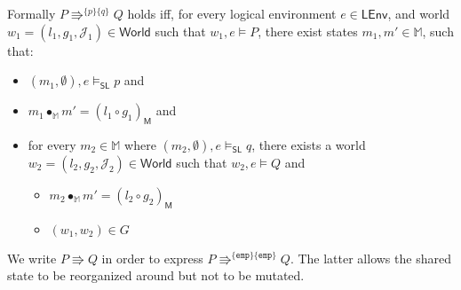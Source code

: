 Formally $P \Rrightarrow^{\{p\}\{q\}} Q$ holds iff, for every logical environment $e \in \mathsf{LEnv}$, and world $w_1 = (l_1, g_1, \mathcal{J}_1) \in \mathsf{World}$ such that $w_1, e \vDash P$, there exist states $m_1, m' \in \mathbb{M}$, such that:
\begin{itemize}
\item $(m_1, \emptyset), e \vDash_\mathsf{SL} p$ and
\item $m_1 \bullet_\mathbb{M} m' = (l_1 \circ g_1)_\mathsf{M}$ and
\item for every $m_2 \in \mathbb{M}$ where $(m_2, \emptyset), e \vDash_\mathsf{SL} q$, there exists a world $w_2 = (l_2, g_2, \mathcal{J}_2) \in \mathsf{World}$ such that $w_2, e \vDash Q$ and
	\begin{itemize}
		\item $m_2 \bullet_\mathbb{M} m' = (l_2 \circ g_2)_\mathsf{M}$
		\item $(w_1, w_2) \in G$
	\end{itemize}
\end{itemize}

We write $P \Rrightarrow Q$ in order to express $P \Rrightarrow^{\{\mathtt{emp}\}\{\mathtt{emp}\}}Q$. The latter allows the shared state to be reorganized around but not to be mutated.
